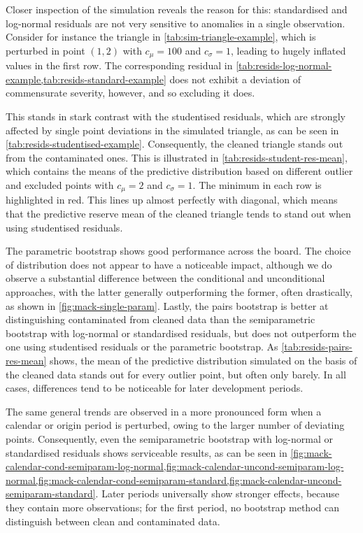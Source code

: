 \documentclass[a4paper]{book}
\begin{document}
Closer inspection of the simulation reveals the reason for this: standardised and log-normal residuals are not very sensitive to anomalies in a single observation. Consider for instance the triangle in \cref{tab:sim-triangle-example}, which is perturbed in point $(1, 2)$ with $c_\mu = 100$ and $c_\sigma = 1$, leading to hugely inflated values in the first row. The corresponding residual in \cref{tab:resids-log-normal-example,tab:resids-standard-example} does not exhibit a deviation of commensurate severity, however, and so excluding it does.

This stands in stark contrast with the studentised residuals, which are strongly affected by single point deviations in the simulated triangle, as can be seen in \cref{tab:resids-studentised-example}. Consequently, the cleaned triangle stands out from the contaminated ones. This is illustrated in \cref{tab:resids-student-res-mean}, which contains the means of the predictive distribution based on different outlier and excluded points with $c_\mu = 2$ and $c_\sigma = 1$. The minimum in each row is highlighted in red. This lines up almost perfectly with diagonal, which means that the predictive reserve mean of the cleaned triangle tends to stand out when using studentised residuals.

The parametric bootstrap shows good performance across the board. The choice of distribution does not appear to have a noticeable impact, although we do observe a substantial difference between the conditional and unconditional approaches, with the latter generally outperforming the former, often drastically, as shown in \cref{fig:mack-single-param}. Lastly, the pairs bootstrap is better at distinguishing contaminated from cleaned data than the semiparametric bootstrap with log-normal or standardised residuals, but does not outperform the one using studentised residuals or the parametric bootstrap. As \cref{tab:resids-pairs-res-mean} shows, the mean of the predictive distribution simulated on the basis of the cleaned data stands out for every outlier point, but often only barely. In all cases, differences tend to be noticeable for later development periods.

The same general trends are observed in a more pronounced form when a calendar or origin period is perturbed, owing to the larger number of deviating points. Consequently, even the semiparametric bootstrap with log-normal or standardised residuals shows serviceable results, as can be seen in \cref{fig:mack-calendar-cond-semiparam-log-normal,fig:mack-calendar-uncond-semiparam-log-normal,fig:mack-calendar-cond-semiparam-standard,fig:mack-calendar-uncond-semiparam-standard}. Later periods universally show stronger effects, because they contain more observations; for the first period, no bootstrap method can distinguish between clean and contaminated data.
\end{document}
